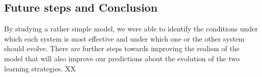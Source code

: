 

 
\subsection*{Future steps and Conclusion}
 
By studying a rather simple model, we were able to identify the conditions under which each system is most effective and under which one or the other system should evolve. There are further steps towards improving the realism of the model that will also improve our predictions about the evolution of the two learning strategies. XX

